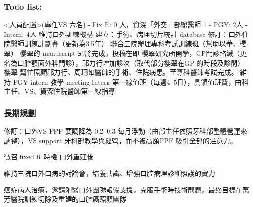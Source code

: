 \documentclass[t,24pt,aspectratio=169]{beamer}
\begin{document}
\begin{frame}[hoved]
\frametitle{Todo list:}
\begin{outline}
\1 <人員配置>(專任VS 六名) - Fix R: 0 人，資深「外交」部總醫師 1 - PGY: 2人
 - Intern: 4人
\1 維持口外訓練機構
\2 建立：手術、病理切片統計 database
\2 修訂：口外住院醫師訓練計劃書（更新為3.5年）
\2 聯合三院辦理專科考試訓練班（幫助以華、櫻翠）
    \3 櫻翠的 manuscript 即將完成，投稿在即
    \3 櫻翠研究所開學，GP門診略減（更名為口腔顎面外科門診），祁力行增加診次（取代部分櫻翠在GP 的時段及診間）
    \3 櫻翠 幫忙照顧祁力行、周珊如醫師的手術、住院病患。至專科醫師考試完成。
\1 維持 PGY intern 教學 meeting
\2 Intern 第一線值班（每週4--5日），具領值班費，由科主任、VS、資深住院醫師第一線指導



\end{outline}
\end{frame}

\begin{frame}[hoved]
\frametitle{長期規劃}
\begin{outline}
\1 修訂：口外VS PPF 要調降為 0.2--0.3 每月浮動（由部主任依照牙科部整體營運來調整），VS support 牙科部教學與經營，而不被高額PPF 吸引全部的注意力。

\1 徵召 fixed R 時機
    \2 口外重建後

\1 維持三院口外口病的討論會，培養共識、增強口腔病理診斷照護的實力

\1 癌症病人治療，邀請附醫口外團隊報備支援，克服手術時技術問題，最终目標在萬芳醫院訓練切除及重建的口腔癌照顧團隊
\end{outline}

\end{frame}



\end{document}
